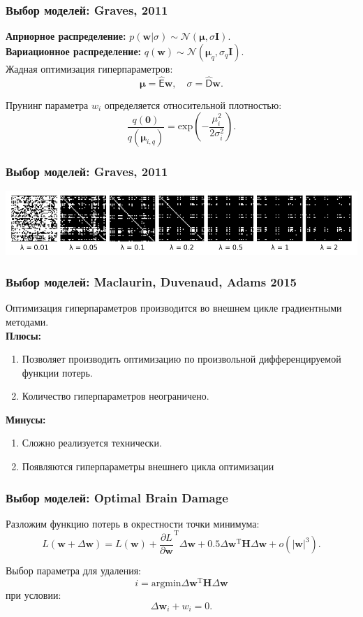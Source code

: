 \documentclass[10pt,pdf,utf8,russian,aspectratio=169]{beamer}
\begin{document}
\begin{frame}
\frametitle{Выбор моделей: Graves, 2011}
\textbf{Априорное распределение:} $p(\mathbf{w}|\sigma) \sim \mathcal{N}(\boldsymbol{\mu}, \sigma \mathbf{I}).$\\
\textbf{Вариационное распределение:} $q (\mathbf{w}) \sim \mathcal{N}(\boldsymbol{\mu}_q, \sigma_q \mathbf{I}).$\\
Жадная оптимизация гиперпараметров:
\[
	\boldsymbol{\mu} = \hat{\mathsf{E}} \mathbf{w},
\quad
	\sigma = \hat{\mathsf{D}} \mathbf{w}.
\]

Прунинг параметра ${w}_i$ определяется относительной плотностью:
\[
	\frac{q(\mathbf{0})}{q(\boldsymbol{\mu}_{i,q})}  = \text{exp}(-\frac{\mu_i^2}{2\sigma_i^2}).
\]
\end{frame}


\begin{frame}
\frametitle{Выбор моделей: Graves, 2011}
\includegraphics[width=\textwidth]{graves.png}
\end{frame}


\begin{frame}
\frametitle{Выбор моделей: Maclaurin, Duvenaud, Adams 2015}
Оптимизация гиперпараметров производится во внешнем цикле градиентными методами.\\
\textbf{Плюсы:}
\begin{enumerate}
\item Позволяет производить оптимизацию по произвольной дифференцируемой функции потерь.
\item Количество гиперпараметров неограничено.
\end{enumerate}
\textbf{Минусы:}
\begin{enumerate}
\item Сложно реализуется технически.
\item Появляются гиперпараметры внешнего цикла оптимизации
\end{enumerate}

\end{frame}


\begin{frame}
\frametitle{Выбор моделей: Optimal Brain Damage}
Разложим функцию потерь в окрестности точки минимума:
\[
	L (\mathbf{w} + \Delta \mathbf{w}) = L (\mathbf{w})  + \frac{\partial{L}}{\partial{\mathbf{w}}}^\text{T}\Delta\mathbf{w} + 0.5\Delta\mathbf{w}^\text{T}\mathbf{H}\Delta\mathbf{w} + o(|\mathbf{w}|^3).
\]

Выбор параметра для удаления:
\[
	i = \text{argmin} \Delta\mathbf{w}^\text{T}\mathbf{H}\Delta\mathbf{w}
\]
при условии:
\[
	\Delta\mathbf{w}_i + w_i = 0.
\]
\end{frame}
\end{document}
